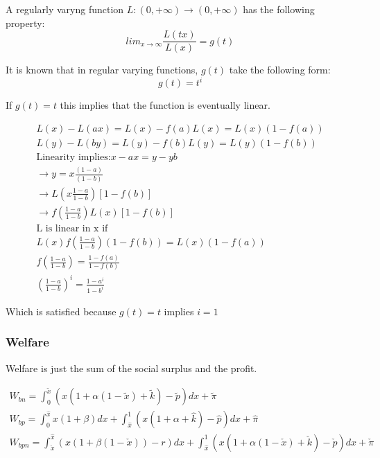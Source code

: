 \begin{definition}
A regularly varyng function $L: (0,+ \infty) \rightarrow (0,+ \infty)$ has the following property:
\begin{equation}
lim_{x \rightarrow \infty} \frac{L(t x)}{L(x)} = g(t)
\end{equation}
\end{definition}

It is known that in regular varying functions, $g(t)$ take the following form\citep{bojanic1963slowly}:
\begin{equation}
g(t)=t^i
\end{equation}

If $g(t)= t$ this implies that the function is eventually linear. 

\begin{align}
L(x)-L(a x) = L(x) - f(a)L(x) = L(x)(1-f(a)) \\
L(y)-L(b y) = L(y) - f(b)L(y) = L(y)(1-f(b)) \\
\text{Linearity  implies:}
x-ax = y-yb \\
\rightarrow y = x \frac{(1-a)}{(1-b)} \\
\rightarrow L\left(x \frac{1-a}{1-b}\right)[1-f(b)] \\
\rightarrow f\left( \frac{1-a}{1-b}\right)L(x)[1-f(b)] \\
\text{L is linear in x if} \\
L(x)f\left(\frac{1-a}{1-b}\right)(1-f(b)) = L(x)(1-f(a)) \\
f\left(\frac{1-a}{1-b} \right) = \frac{1-f(a)}{1-f(b)} \\
\left(\frac{1-a}{1-b} \right)^i = \frac{1-a^i}{1-b^i} 
\end{align}

Which is satisfied because $g(t)=t$ implies $i=1$

\subsubsection{Welfare}

Welfare is just the sum of the social surplus and the profit.

\begin{align*}
W_{bn} = \int^{\tilde{x}}_0 \left(x(1+\alpha(1-\tilde{x})+\tilde{k})-\tilde{p} \right) dx + \tilde{\pi}  \\
W_{bp} = \int^{\hat{x}}_0 x(1+\beta) dx +\int^{1}_{\hat{x}} \left(x(1+\alpha+\hat{k}) - \hat{p} \right) dx + \hat{\pi} \\
W_{bpn} =
\int^{\hat{x}}_{\check{x}} \left(x(1+\beta(1-\check{x}))-r \right)dx +\int^{1}_{\hat{x}} \left(x(1+\alpha(1-\check{x})+\check{k}) - \check{p} \right) dx + \check{\pi}
\end{align*}

